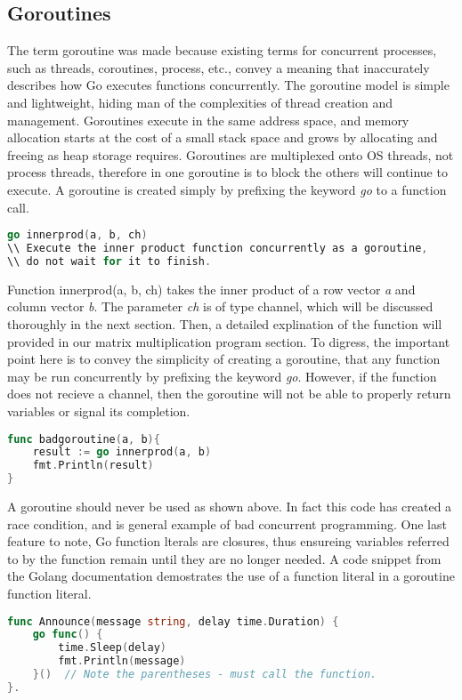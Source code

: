 \subsection{Goroutines}
	The term goroutine was made because existing terms for concurrent processes, such as threads, coroutines, process, etc., convey a meaning that inaccurately describes how Go executes functions concurrently. The goroutine model is simple and lightweight, hiding man of the complexities of thread creation and management. Goroutines execute in the same address space, and memory allocation starts at the cost of a small stack space and grows by allocating and freeing as heap storage requires. Goroutines are multiplexed onto OS threads, not process threads, therefore in one goroutine is to block the others will continue to execute.\cite{website:go-lang-documentation}
	A goroutine is created simply by prefixing the keyword \emph{go} to a function call.	
\begin{lstlisting}[language=Go]
go innerprod(a, b, ch) 
\\ Execute the inner product function concurrently as a goroutine,
\\ do not wait for it to finish.
\end{lstlisting}
Function innerprod(a, b, ch) takes the inner product of a row vector \emph{a} and column vector \emph{b}. The parameter \emph{ch} is of type channel, which will be discussed thoroughly in the next section. Then, a detailed explination of the function will provided in our matrix multiplication program section. To digress, the important point here is to convey the simplicity of creating a goroutine, that any function may be run concurrently by prefixing the keyword \emph{go}. However, if the function does not recieve a channel, then the goroutine will not be able to properly return variables or signal its completion.
\begin{lstlisting}[language=Go]
func badgoroutine(a, b){
	result := go innerprod(a, b)
	fmt.Println(result)
}
\end{lstlisting}
A goroutine should never be used as shown above. In fact this code has created a race condition, and is general example of bad concurrent programming.
	One last feature to note, Go function lterals are closures, thus ensureing variables referred to by the function remain until they are no longer needed. A code snippet from the Golang documentation demostrates the use of a function literal in a goroutine function literal.
\begin{lstlisting}[language=Go]
func Announce(message string, delay time.Duration) {
    go func() {
        time.Sleep(delay)
        fmt.Println(message)
    }()  // Note the parentheses - must call the function.
}.
\end{lstlisting}
